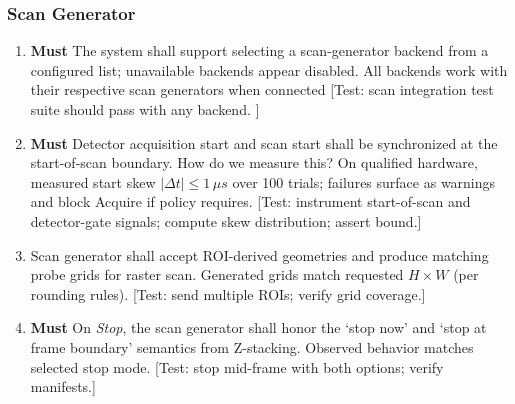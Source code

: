 \documentclass[12pt]{article}
\newcommand{\PriorityTag}[2]{%
  \colorbox{#2!25}{\footnotesize\textsf{\textbf{#1}}}\hspace{0.6em}}
\newcommand{\must}{\leavevmode\PriorityTag{Must}{green}}
\newcounter{reqgrp}[section] %
\newcounter{reqno}
\newcommand{\reqprefix}{GEN}
\newenvironment{requirements}[1]{%
  \renewcommand{\reqprefix}{#1}%
  \refstepcounter{reqgrp}%
  \setcounter{reqno}{0}%
  \begin{enumerate}[leftmargin=*]
}{\end{enumerate}}
\begin{document}
\subsubsection{Scan Generator}
\begin{requirements}{SCN}

\item \must {}
  {The system shall support selecting a scan-generator backend from a configured list; unavailable backends appear disabled.}
  {All backends work with their respective scan generators when connected}
  [Test: scan integration test suite should pass with any backend. ]

\item \must {}
  {Detector acquisition start and scan start shall be synchronized at the start-of-scan boundary. How do we measure this?}
  {On qualified hardware, measured start skew \(|\Delta t|\le 1\,\mu s\) over 100 trials; failures surface as warnings and block Acquire if policy requires.}
  [Test: instrument start-of-scan and detector-gate signals; compute skew distribution; assert bound.]

\item {}
  {Scan generator shall accept ROI-derived geometries and produce matching probe grids for raster scan.}
  {Generated grids match requested \(H\times W\) (per rounding rules).}
  [Test: send multiple ROIs; verify grid coverage.]

\item \must {}
  {On \emph{Stop}, the scan generator shall honor the `stop now' and `stop at frame boundary' semantics from Z-stacking.}
  {Observed behavior matches selected stop mode.}
  [Test: stop mid-frame with both options; verify manifests.]
\end{requirements}
\end{document}
